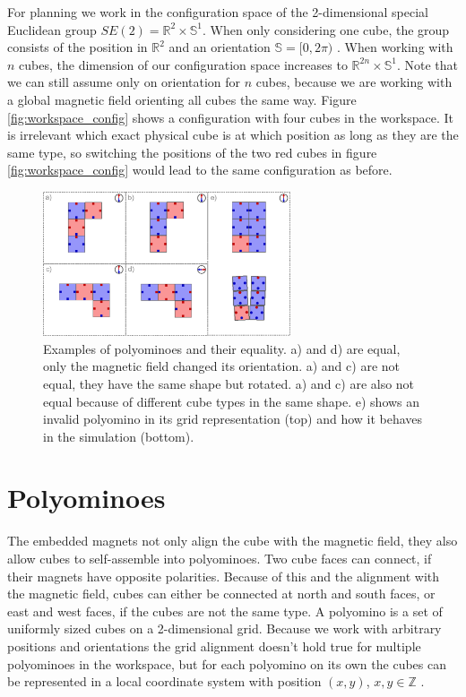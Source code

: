For planning we work in the configuration space of the 2-dimensional special Euclidean group $SE(2) = \mathbb{R}^2 \times \mathbb{S}^1$.
When only considering one cube, the group consists of the position in $\mathbb{R}^2$ and an orientation $\mathbb{S} = [0,2\pi)$ \cite{LaValle2006}.
When working with $n$ cubes, the dimension of our configuration space increases to $\mathbb{R}^{2n} \times \mathbb{S}^1$.
Note that we can still assume only on orientation for $n$ cubes, because we are working with a global magnetic field orienting all cubes the same way.
Figure \ref{fig:workspace_config} shows a configuration with four cubes in the workspace.
It is irrelevant which exact physical cube is at which position as long as they are the same type, so switching the positions of the two red cubes in figure \ref{fig:workspace_config} would lead to the same configuration as before.

\begin{figure}
	\centering
	\includegraphics[width=0.65\textwidth]{figures/polyominoes.pdf}
	\caption{Examples of polyominoes and their equality. a) and d) are equal, only the magnetic field changed its orientation. a) and c) are not equal, they have the same shape but rotated. a) and c) are also not equal because of different cube types in the same shape. e) shows an invalid polyomino in its grid representation (top) and how it behaves in the simulation (bottom).}
	\label{fig:polyominoes}
\end{figure}

\section{Polyominoes}
The embedded magnets not only align the cube with the magnetic field, they also allow cubes to self-assemble into polyominoes.
Two cube faces can connect, if their magnets have opposite polarities.
Because of this and the alignment with the magnetic field, cubes can either be connected at north and south faces, or east and west faces, if the cubes are not the same type.
A polyomino is a set of uniformly sized cubes on a 2-dimensional grid.
Because we work with arbitrary positions and orientations the grid alignment doesn't hold true for multiple polyominoes in the workspace, but for each polyomino on its own the cubes can be represented in a local coordinate system with position $(x,y)$, $x,y \in \mathbb{Z}$ \cite{Lu2021}.


